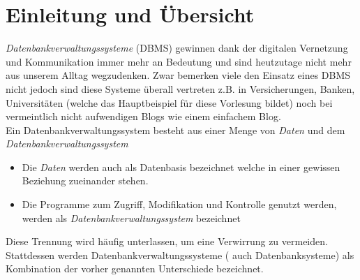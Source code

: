\chapter{Einleitung und Übersicht}
\textit{Datenbankverwaltungssysteme} (DBMS) gewinnen dank der digitalen Vernetzung und Kommunikation immer mehr an Bedeutung und sind heutzutage nicht mehr aus unserem Alltag wegzudenken. Zwar bemerken viele den Einsatz eines DBMS nicht jedoch sind diese Systeme überall vertreten z.B. in Versicherungen, Banken, Universitäten (welche das Hauptbeispiel für diese Vorlesung bildet) noch bei vermeintlich nicht aufwendigen Blogs wie einem einfachem Blog.\\
Ein Datenbankverwaltungssystem besteht aus einer Menge von \textit{Daten} und dem \textit{Datenbankverwaltungssystem} 
\begin{itemize}
	\item Die \textit{Daten} werden auch als Datenbasis bezeichnet welche in einer gewissen Beziehung zueinander stehen. 
	\item Die Programme zum Zugriff, Modifikation und Kontrolle genutzt werden, werden als \textit{Datenbankverwaltungssystem} bezeichnet
\end{itemize}
Diese Trennung wird häufig unterlassen, um eine Verwirrung zu vermeiden. Stattdessen werden Datenbankverwaltungssysteme ( auch Datenbanksysteme) als Kombination der vorher genannten Unterschiede bezeichnet. 

